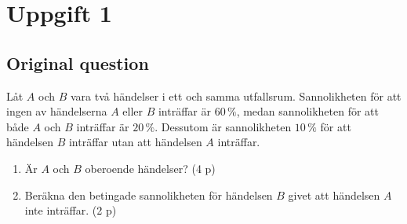\documentclass[10pt]{article}
\begin{document}
\newcommand{\uppgiftSixQuestion}{%
Ett nytt parkeringshus har byggts i Grönköping med hopp om att locka
fler personer till butikerna i centrum. Kostnaden för parkeringshuset
ska på sikt täckas av intäkterna från parkeringsavgifter. Under
30 veckodagar noterades de dagliga intäkterna från parkeringsavgifter,
vilka anses utgöra ett observerat stickprov från en normalfördelning.
Stickprovets medelvärde och standardavvikelse är 1260 kr respektive
150 kr.

\begin{enumerate}[label=\alph*)]
\item
Bestäm ett $90\,\%$ konfidensintervall för den genomsnittliga dagliga
intäkten från parkeringsavgifter baserat på stickprovet ovan.
\hfill (3 p)
\end{enumerate}

Den konsult som var rådgivande när bygget av parkeringshuset
planerades förutsåg att den genomsnittliga dagliga intäkten från
parkeringsavgifter kommer att vara 1280 kr.

\begin{enumerate}[label=\alph*),resume]
\item
Ange lämpliga hypoteser $H_0$ och $H_1$ för att pröva konsultens
hypotes. Motivera ditt svar!
\hfill (1 p)

\item
Genomför hypotesprövning enligt b) med felrisk $10\,\%$ och baserat
på det observerade stickprovet ovan. Verkar konsultens hypotes rimlig
eller kan den förkastas?
\hfill (2 p)
\end{enumerate}
}

\section*{Uppgift 1}

\subsection*{Original question}
Låt $A$ och $B$ vara två händelser i ett och samma utfallsrum.
Sannolikheten för att ingen av händelserna $A$ eller $B$ inträffar
är $60\,\%$, medan sannolikheten för att både $A$ och $B$ inträffar
är $20\,\%$. Dessutom är sannolikheten $10\,\%$ för att händelsen
$B$ inträffar utan att händelsen $A$ inträffar.

\begin{enumerate}[label=\alph*)]
\item Är $A$ och $B$ oberoende händelser? \hfill (4 p)
\item Beräkna den betingade sannolikheten för händelsen $B$ givet
att händelsen $A$ inte inträffar. \hfill (2 p)
\end{enumerate}
\end{document}
